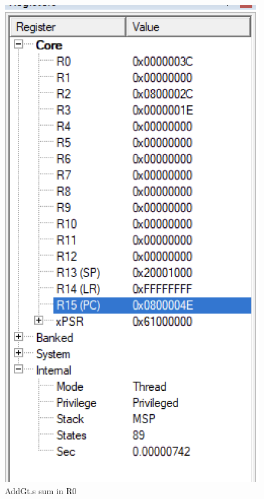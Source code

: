 \documentclass{article}
\begin{document}
\begin{figure}
\caption{AddGt.s sum in R0}
\centering
\includegraphics{../Images/AddGt_sum_in_r0.png}
\end{figure}
\end{document}
